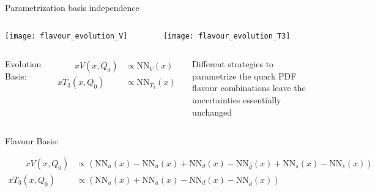 \begin{frame}{Parametrization basis independence}
    \begin{columns}
        \begin{column}[T]{0.48\textwidth}
        \vspace*{0pt}%
	        \begin{center}
	            \texttt{[image: flavour\_evolution\_V]} \\
	        \end{center}
        \end{column}
        \begin{column}[t]{0.48\textwidth}
        \vspace{0pt}%
	        \begin{center}
	            \texttt{[image: flavour\_evolution\_T3]} \\
	        \end{center}
        \end{column}
    \end{columns}
    \begin{columns}
		    Evolution Basis:
		    {\footnotesize
		    \begin{fleqn}
		    \begin{align*}
		       \qquad x V\left(x, Q_{0}\right) &\propto \mathrm{NN}_{V}(x)\\
		        x T_{3}\left(x, Q_{0}\right) &\propto \mathrm{NN}_{T_{3}}(x)
		    \end{align*}
		    \end{fleqn}
		    }
            \begin{block}{}
                Different strategies to parametrize the quark PDF flavour combinations leave the uncertainties essentially unchanged
            \end{block}
    \end{columns}
    \vspace*{-0.5em}
    Flavour Basis:
    {\footnotesize
    \begin{fleqn}
    \begin{align*}
        \qquad x V\left(x, Q_{0}\right) &\propto\left(\mathrm{NN}_{u}(x)-\mathrm{NN}_{\bar{u}}(x)+\mathrm{NN}_{d}(x)-\mathrm{NN}_{\bar{d}}(x)+\mathrm{NN}_{s}(x)-\mathrm{NN}_{\bar{s}}(x)\right) \\
        x T_{3}\left(x, Q_{0}\right) &\propto\left(\mathrm{NN}_{u}(x)+\mathrm{NN}_{\bar{u}}(x)-\mathrm{NN}_{d}(x)-\mathrm{NN}_{\bar{d}}(x)\right)
    \end{align*}
    \end{fleqn}
    }
\end{frame}



